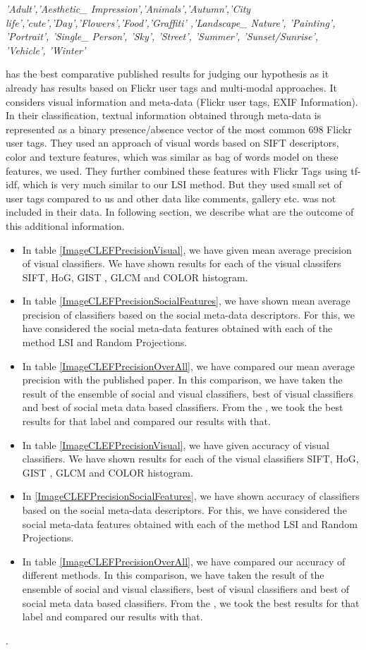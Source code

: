 \textit{'Adult','Aesthetic\_ Impression','Animals','Autumn','City life','cute','Day','Flowers','Food','Graffiti' ,'Landscape\_ Nature', 'Painting', 'Portrait', 'Single\_ Person', 'Sky', 'Street', 'Summer', 'Sunset/Sunrise', 'Vehicle', 'Winter'}

 \citet*{CLEF} has the best comparative published results for judging our hypothesis as it already has results based on Flickr user tags and multi-modal approaches. It considers visual information and meta-data (Flickr user tags, EXIF Information). In their classification, textual information obtained through meta-data is represented as a binary presence/absence vector of the most common 698 Flickr user tags. They used an approach of visual words based on SIFT descriptors, color and texture features, which was similar as bag of words model on these features, we used. They further combined these features with Flickr Tags using tf-idf, which is very much similar to our LSI method. But they used small set of user tags compared to us and other data like comments, gallery etc. was not included in their data. In following section, we describe what are the outcome of this additional information.

\begin{itemize}
\item In table \ref{ImageCLEFPrecisionVisual}, we have given mean average precision of visual classifiers. We have shown results for each of the visual classifers SIFT, HoG, GIST , GLCM and COLOR histogram.
\item In table \ref{ImageCLEFPrecisionSocialFeatures}, we have shown mean average precision of classifiers based on the social meta-data descriptors. For this, we have considered the social meta-data features obtained with each of the method LSI and Random Projections.
\item In table \ref{ImageCLEFPrecisionOverAll}, we have compared our mean average precision with the published paper. In this comparison, we have taken the result of the ensemble of social and visual classifiers,  best of visual classifiers and best of social meta data based classifiers. From the  \citet*{CLEF}, we took the best results for that label and compared our results with that.
\item In table \ref{ImageCLEFPrecisionVisual}, we have given accuracy of visual classifiers. We have shown results for each of the visual classifiers SIFT, HoG, GIST , GLCM and COLOR histogram.
\item In \ref{ImageCLEFPrecisionSocialFeatures}, we have shown accuracy of classifiers based on the social meta-data descriptors. For this, we have considered the social meta-data features obtained with each of the method LSI and Random Projections.
\item In table \ref{ImageCLEFPrecisionOverAll}, we have compared our accuracy of different methods. In this comparison, we have taken the result of the ensemble of social and visual classifiers,  best of visual classifiers and best of social meta data based classifiers. From the  \citet*{CLEF}, we took the best results for that label and compared our results with that.
\end{itemize}
.
